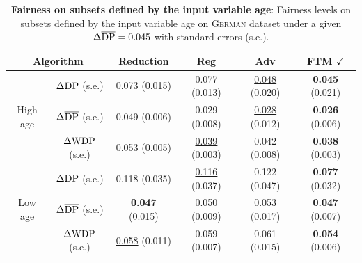 \documentclass[10pt]{article} %
\begin{document}
\begin{table}[h]
    \scriptsize
    \centering
    \caption{
    \textbf{Fairness on subsets defined by the input variable age}:
    Fairness levels on subsets defined by the input variable age on \textsc{German} dataset under a given $\Delta \overline{\textup{DP}} = 0.045$ with standard errors (s.e.).
    }
    \label{table:subgroup-append}
    \begin{tabular}{c|c||c|c|c|c}
        \toprule
        \multicolumn{2}{c||}{Algorithm} & Reduction & Reg & Adv & FTM $\checkmark$
        \\
        \midrule
        \midrule
        \multirow{3}{*}{High age} & $\Delta \textup{DP}$ (s.e.) & 0.073 (0.015) & 0.077 (0.013) & \underline{0.048} (0.020) & \textbf{0.045} (0.021)
        \\
        & $\Delta \overline{\textup{DP}}$ (s.e.) & 0.049 (0.006) & 0.029 (0.008) & \underline{0.028} (0.012) & \textbf{0.026} (0.006)
        \\
        & $\Delta \textup{WDP}$ (s.e.) & 0.053 (0.005) & \underline{0.039} (0.003) & 0.042 (0.008) & \textbf{0.038} (0.003)
        \\
        \midrule
        \multirow{3}{*}{Low age} & $\Delta \textup{DP}$ (s.e.) & 0.118 (0.035) & \underline{0.116} (0.037) & 0.122 (0.047) & \textbf{0.077} (0.032)
        \\
        & $\Delta \overline{\textup{DP}}$ (s.e.) & \textbf{0.047} (0.015) & \underline{0.050} (0.009) & 0.053 (0.017) & \textbf{0.047} (0.007)
        \\
        & $\Delta \textup{WDP}$ (s.e.) & \underline{0.058} (0.011) & 0.059 (0.007) & 0.061 (0.015) & \textbf{0.054} (0.006)
        \\
        \bottomrule
    \end{tabular}
\end{table}

\end{document}
